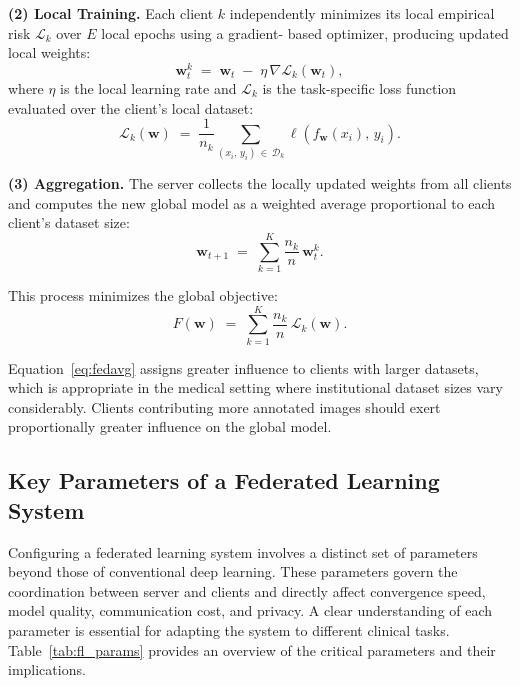 \textbf{(2) Local Training.} Each client $k$ independently minimizes its
local empirical risk $\mathcal{L}_k$ over $E$ local epochs using a gradient-
based optimizer, producing updated local weights:
\begin{equation}
    \mathbf{w}_t^k \;=\; \mathbf{w}_t \;-\; \eta\,\nabla\mathcal{L}_k(\mathbf{w}_t),
\end{equation}
where $\eta$ is the local learning rate and $\mathcal{L}_k$ is the
task-specific loss function evaluated over the client's local dataset:
\begin{equation}
    \mathcal{L}_k(\mathbf{w}) \;=\;
    \frac{1}{n_k}\sum_{(x_i,\,y_i)\,\in\,\mathcal{D}_k}
    \ell\!\left(f_{\mathbf{w}}(x_i),\,y_i\right).
\end{equation}
 
\textbf{(3) Aggregation.} The server collects the locally updated weights
from all clients and computes the new global model as a weighted average
proportional to each client's dataset size:
\begin{equation}
    \mathbf{w}_{t+1} \;=\; \sum_{k=1}^{K}\frac{n_k}{n}\,\mathbf{w}_t^k.
    \label{eq:fedavg}
\end{equation}
 
This process minimizes the global objective:
\begin{equation}
    F(\mathbf{w}) \;=\; \sum_{k=1}^{K}\frac{n_k}{n}\,\mathcal{L}_k(\mathbf{w}).
\end{equation}
 
Equation~\eqref{eq:fedavg} assigns greater influence to clients with larger
datasets, which is appropriate in the medical setting where institutional
dataset sizes vary considerably. Clients contributing more annotated images
should exert proportionally greater influence on the global model.
 
\subsection{Key Parameters of a Federated Learning System}
\label{subsec:fl_parameters}
 
Configuring a federated learning system involves a distinct set of
parameters beyond those of conventional deep learning. These parameters
govern the coordination between server and clients and directly affect
convergence speed, model quality, communication cost, and privacy. A clear
understanding of each parameter is essential for adapting the system to
different clinical tasks. Table~\ref{tab:fl_params} provides an overview
of the critical parameters and their implications.
 
